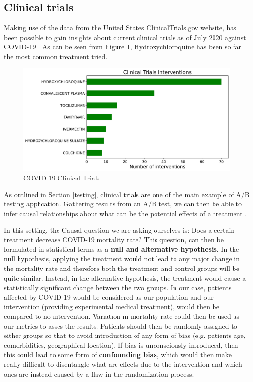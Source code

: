 \begin{appendices}
\section{Clinical trials}
\label{ab_trials}
Making use of the data from the United States ClinicalTrials.gov website, has been possible to gain insights about current clinical trials as of July 2020 against COVID-19 \cite{trials_data}. As can be seen from Figure \ref{trials}, Hydroxychloroquine has been so far the most common treatment tried.
\vspace{-0.2cm}
\begin{figure}[ht!]%
    \centering
    \includegraphics[width=0.65\linewidth]{latex/images/trials.pdf}
    \vspace{-0.2cm}
    \caption{COVID-19 Clinical Trials}
    \label{trials}
\end{figure}
\vspace{-0.2cm}

As outlined in Section \ref{testing}, clinical trials are one of the main example of A/B testing application. Gathering results from an A/B test, we can then be able to infer causal relationships about what can be the potential effects of a treatment \cite{power}.

In this setting, the Causal question we are asking ourselves is: Does a certain treatment decrease COVID-19 mortality rate? This question, can then be formulated in statistical terms as a \textbf{null and alternative hypothesis}. In the null hypothesis, applying the treatment would not lead to any major change in the mortality rate and therefore both the treatment and control groups will be quite similar. Instead, in the alternative hypothesis, the treatment would cause a statistically significant change between the two groups. In our case, patients affected by COVID-19 would be considered as our population and our intervention (providing experimental medical treatment), would then be compared to no intervention. Variation in mortality rate could then be used as our metrics to asses the results. Patients should then be randomly assigned to either groups so that to avoid introduction of any form of bias (e.g. patients age, comorbidities, geographical location). If bias is unconsciously introduced, then this could lead to some form of \textbf{confounding bias}, which would then make really difficult to disentangle what are effects due to the intervention and which ones are instead caused by a flaw in the randomization process. 


\end{appendices}
